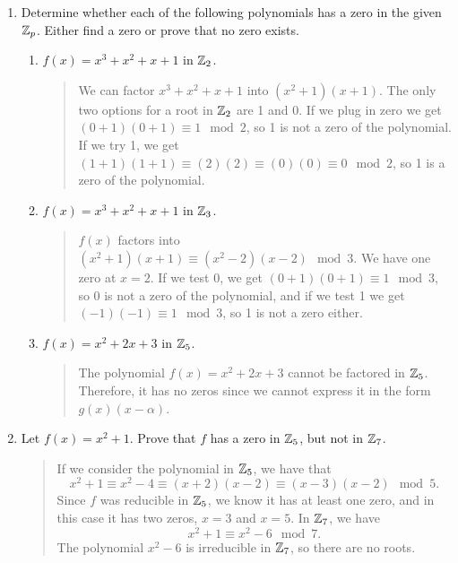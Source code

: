 \documentclass{hw}
\begin{document}

\begin{enumerate}
\item Determine whether each of the following polynomials has a zero in the given $\mathbb{Z}_{p}$. Either
find a zero or prove that no zero exists.
\begin{enumerate}
\item $f(x)=x^3+x^2+x+1$ in $\mathbb{Z}_{2}$.
\begin{quote}
We can factor $x^3+x^2+x+1$ into $(x^{2}+1)(x+1)$. The only two options for a root in $\mathbb{Z}_{2}$ are
1 and 0. If we plug in zero we get $(0+1)(0+1)\equiv1\mod2$, so 1 is not a zero of the polynomial.
If we try 1, we get $(1+1)(1+1)\equiv(2)(2)\equiv(0)(0)\equiv0\mod2$, so 1 is a zero of the
polynomial.
\end{quote}
\item $f(x)=x^3+x^2+x+1$ in $\mathbb{Z}_{3}$.
\begin{quote}
$f(x)$ factors into $(x^{2}+1)(x+1)\equiv(x^{2}-2)(x-2)\mod3$. We have one zero at $x=2$. If we test
0, we get $(0+1)(0+1)\equiv1\mod3$, so 0 is not a zero of the polynomial, and if we test 1 we get
$(-1)(-1)\equiv1\mod3$, so 1 is not a zero either.
\end{quote}
\item $f(x)=x^{2}+2x+3$ in $\mathbb{Z}_{5}$.
\begin{quote}
The polynomial $f(x)=x^{2}+2x+3$ cannot be factored in $\mathbb{Z}_{5}$. Therefore, it has no zeros since
we cannot express it in the form $g(x)(x-\alpha)$.
\end{quote}
\end{enumerate}

\item Let $f(x)=x^{2}+1$. Prove that $f$ has a zero in $\mathbb{Z}_{5}$, but not in $\mathbb{Z}_{7}$.
\begin{quote}
If we consider the polynomial in $\mathbb{Z}_{5}$, we have that
\[x^{2}+1\equiv x^{2}-4\equiv(x+2)(x-2)\equiv(x-3)(x-2)\mod5.\]
Since $f$ was reducible in $\mathbb{Z}_{5}$, we know it has at least one zero, and in this case it has
two zeros, $x=3$ and $x=5$. In $\mathbb{Z}_{7}$, we have
\[x^{2}+1\equiv x^{2}-6\mod7.\]
The polynomial $x^{2}-6$ is irreducible in $\mathbb{Z}_{7}$, so there are no roots.
\end{quote}
\end{enumerate}
\end{document}
